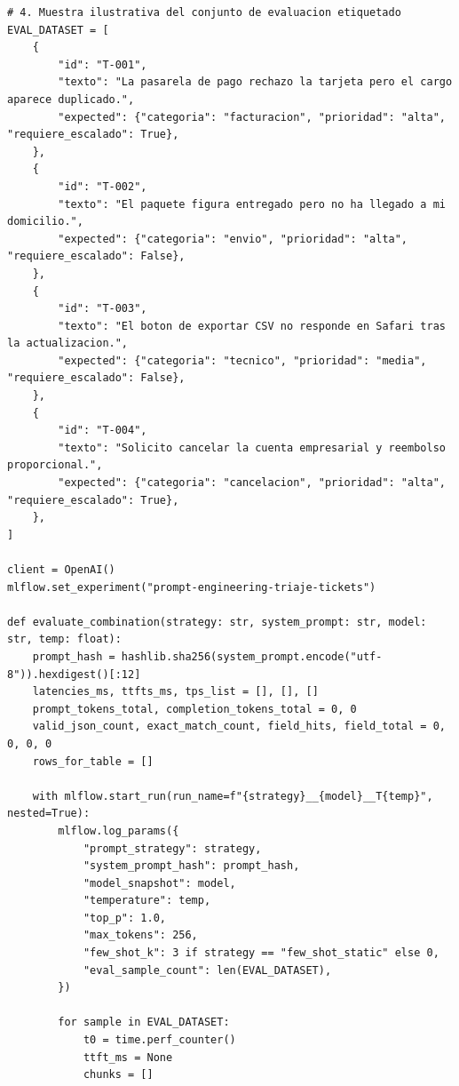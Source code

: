\begin{lstlisting}[style=python, caption={Barrido sistemático de 3 plantillas $\times$ 2 temperaturas $\times$ 2 modelos registrado en MLflow Tracking.}, label={lst:prompt-sweep}]
# 4. Muestra ilustrativa del conjunto de evaluacion etiquetado
EVAL_DATASET = [
    {
        "id": "T-001",
        "texto": "La pasarela de pago rechazo la tarjeta pero el cargo aparece duplicado.",
        "expected": {"categoria": "facturacion", "prioridad": "alta", "requiere_escalado": True},
    },
    {
        "id": "T-002",
        "texto": "El paquete figura entregado pero no ha llegado a mi domicilio.",
        "expected": {"categoria": "envio", "prioridad": "alta", "requiere_escalado": False},
    },
    {
        "id": "T-003",
        "texto": "El boton de exportar CSV no responde en Safari tras la actualizacion.",
        "expected": {"categoria": "tecnico", "prioridad": "media", "requiere_escalado": False},
    },
    {
        "id": "T-004",
        "texto": "Solicito cancelar la cuenta empresarial y reembolso proporcional.",
        "expected": {"categoria": "cancelacion", "prioridad": "alta", "requiere_escalado": True},
    },
]

client = OpenAI()
mlflow.set_experiment("prompt-engineering-triaje-tickets")

def evaluate_combination(strategy: str, system_prompt: str, model: str, temp: float):
    prompt_hash = hashlib.sha256(system_prompt.encode("utf-8")).hexdigest()[:12]
    latencies_ms, ttfts_ms, tps_list = [], [], []
    prompt_tokens_total, completion_tokens_total = 0, 0
    valid_json_count, exact_match_count, field_hits, field_total = 0, 0, 0, 0
    rows_for_table = []

    with mlflow.start_run(run_name=f"{strategy}__{model}__T{temp}", nested=True):
        mlflow.log_params({
            "prompt_strategy": strategy,
            "system_prompt_hash": prompt_hash,
            "model_snapshot": model,
            "temperature": temp,
            "top_p": 1.0,
            "max_tokens": 256,
            "few_shot_k": 3 if strategy == "few_shot_static" else 0,
            "eval_sample_count": len(EVAL_DATASET),
        })

        for sample in EVAL_DATASET:
            t0 = time.perf_counter()
            ttft_ms = None
            chunks = []


\end{lstlisting}
